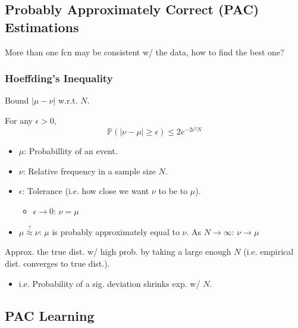 \subsection{Probably Approximately Correct (PAC) Estimations}
\begin{motivation}
    More than one fcn may be consistent w/ the data, how to find the best one?
\end{motivation}

\subsubsection{Hoeffding's Inequality}
\begin{motivation}
    Bound $|\mu - \nu|$ w.r.t. $N$.
\end{motivation}

\begin{definition}
    For any $\epsilon > 0$,
    \begin{equation}
        \mathbb{P}(|\nu - \mu| \geq \epsilon) \leq 2e^{-2\epsilon^2N}
    \end{equation}
    \begin{itemize}
        \item $\mu$: Probabillity of an event.
        \item $\nu$: Relative frequency in a sample size $N$.
        \item $\epsilon$: Tolerance (i.e. how close we want $\nu$ to be to $\mu$).
        \begin{itemize}
            \item $\epsilon \rightarrow 0$: $\nu = \mu$
        \end{itemize}
        \item $\mu \overset{?}{\approx} \nu $: $\mu$ is probably approximately equal to $\nu$. As $N \rightarrow \infty$: $\nu \rightarrow \mu$
    \end{itemize}
\end{definition}

\begin{warning}
    Approx. the true dist. w/ high prob. by taking a large enough $N$ (i.e. empirical dist. converges to true dist.).
    \begin{itemize}
        \item i.e. Probability of a sig. deviation shrinks exp. w/ $N$.
    \end{itemize}
\end{warning}

\subsection{PAC Learning}
